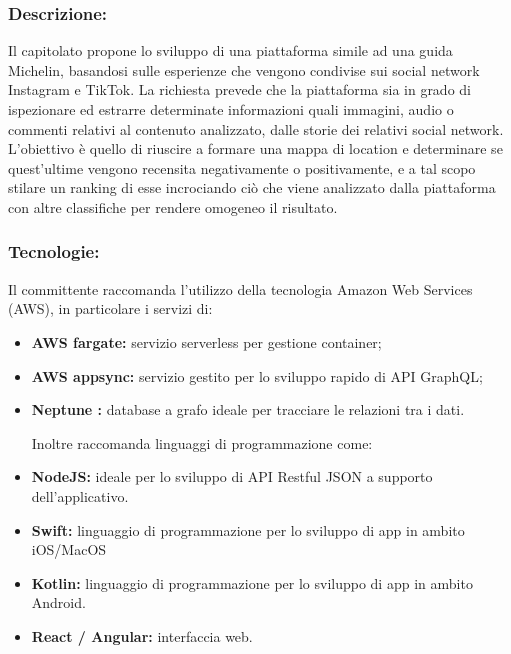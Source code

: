 \subsubsection{Descrizione:}
Il capitolato propone lo sviluppo di una piattaforma simile ad una guida Michelin, basandosi sulle esperienze che vengono condivise sui social network Instagram e TikTok.
La richiesta prevede che la piattaforma sia in grado di ispezionare ed estrarre determinate informazioni quali immagini, audio o commenti relativi al contenuto analizzato, dalle storie dei relativi social network.
L'obiettivo è quello di riuscire a formare una mappa di location e determinare se quest'ultime vengono recensita negativamente o positivamente, e a tal scopo stilare un ranking di esse incrociando ciò che viene analizzato dalla piattaforma con altre classifiche per rendere omogeneo il risultato.
\subsubsection{Tecnologie:}
Il committente raccomanda l'utilizzo della tecnologia Amazon Web Services (AWS), in particolare i servizi di:
\begin{itemize}
	\item \textbf{AWS fargate:} servizio serverless per gestione container;
	\item \textbf{AWS appsync:} servizio gestito per lo sviluppo rapido di API GraphQL;
	\item \textbf{Neptune :} database a grafo ideale per tracciare le relazioni tra i dati.
	
	Inoltre raccomanda linguaggi di programmazione come:
	\item \textbf{NodeJS:} ideale per lo sviluppo di API Restful JSON a supporto dell'applicativo.
	\item \textbf{Swift:} linguaggio di programmazione per lo sviluppo di app in ambito iOS/MacOS
	\item \textbf{Kotlin:} linguaggio di programmazione per lo sviluppo di app in ambito Android.
	\item \textbf{React / Angular:} interfaccia web.
\end{itemize}

